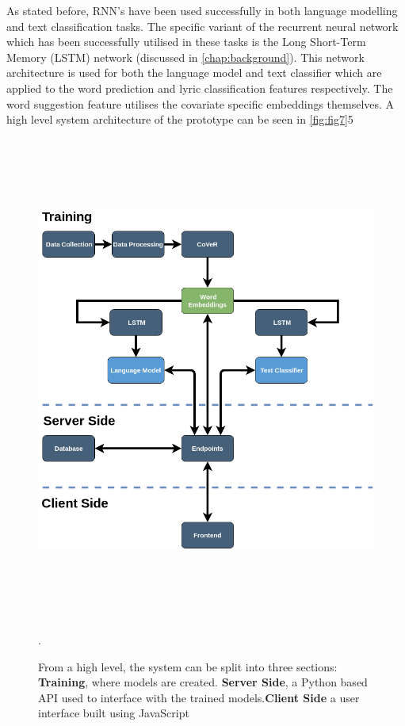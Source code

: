 \noindent
\newline
As stated before, RNN's have been used successfully in both language modelling and text classification tasks. The specific variant of the recurrent neural network which has been successfully utilised in these tasks is the Long Short-Term Memory (LSTM) network (discussed in \autoref{chap:background}). This network architecture is used for both the language model and text classifier which are applied to the word prediction and lyric classification features respectively. The word suggestion feature utilises the covariate specific embeddings themselves. A high level system architecture of the prototype can be seen in \autoref{fig:fig7}5
\begin{figure}[h]	
	\includegraphics[width=15cm, height=16cm]{./figures/fig7}
	\centering
	\caption[SONGIFAI: High Level Architecture]{From a high level, the system can be split into three sections: \textbf{Training}, where models are created. \textbf{Server Side}, a Python based API used to interface with the trained models.\textbf{Client Side} a user interface built using JavaScript}.
	\label{fig:fig7}
\end{figure}
